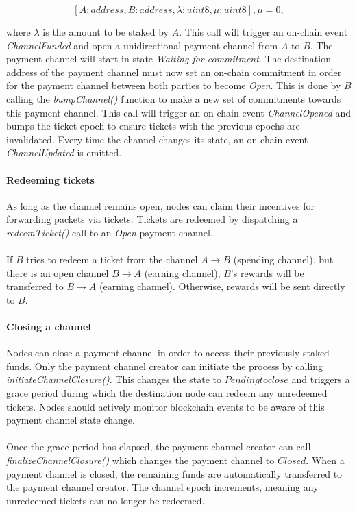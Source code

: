 $$[A: address, B: address, \lambda: uint8, \mu: uint8], \mu = 0,$$

where $\lambda$ is the amount to be staked by $A$. This call will trigger an on-chain event \textit{ChannelFunded}
and open a unidirectional payment channel from $A$ to $B$. The payment channel will start in state \textit{Waiting for commitment}. The destination address of the
payment channel must now set an on-chain commitment in order for the payment
channel between both parties to become \textit{Open}. This is done by $B$
calling the \textit{bumpChannel()} function to make a new set of commitments
towards this payment channel. This call will trigger an on-chain event
\textit{ChannelOpened} and bumps the ticket epoch to ensure tickets with the
previous epochs are invalidated. Every time the channel changes its state, an on-chain event \textit{ChannelUpdated} is emitted.

\paragraph{Redeeming tickets}
As long as the channel remains open, nodes can claim their incentives for
forwarding packets via tickets. Tickets are redeemed by dispatching a
\textit{redeemTicket()} call to an \textit{Open} payment channel.
\\~\\If $B$ tries to redeem a ticket from the channel $A\rightarrow B$ (spending
channel), but there is an open channel $B\rightarrow A$ (earning channel),
$B$'s rewards will be transferred to $B\rightarrow A$ (earning channel).
Otherwise, rewards will be sent directly to $B$.

\paragraph{Closing a channel}
Nodes can close a payment channel in order to access their previously staked
funds. Only the payment channel creator can initiate the process by calling
\textit{initiateChannelClosure()}. This changes the state to $Pending to close$
and triggers a grace period during which the destination node can redeem
any unredeemed tickets. Nodes should actively monitor blockchain events to
be aware of this payment channel state change.
\\~\\Once the grace period has elapsed, the payment channel creator can call
\textit{finalizeChannelClosure()} which changes the payment channel to
$Closed$. When a payment channel is closed, the remaining funds are automatically transferred
to the payment channel creator. The channel epoch increments, meaning any unredeemed tickets can no longer be redeemed.

